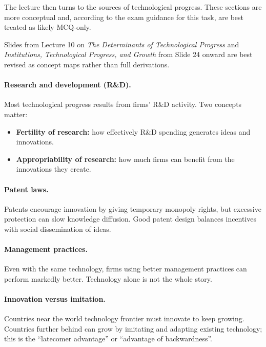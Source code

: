 \documentclass[12pt]{article}
\begin{document}
The lecture then turns to the sources of technological progress. These sections are more conceptual and, according to the exam guidance for this task, are best treated as likely MCQ-only.

\begin{examtip}[title={Exam Focus: Likely MCQ-only}]
Slides from Lecture 10 on \emph{The Determinants of Technological Progress} and \emph{Institutions, Technological Progress, and Growth} from Slide 24 onward are best revised as concept maps rather than full derivations.
\end{examtip}

\paragraph{Research and development (R\&D).}
Most technological progress results from firms' R\&D activity. Two concepts matter:
\begin{itemize}[leftmargin=1.5em]
\item \textbf{Fertility of research:} how effectively R\&D spending generates ideas and innovations.
\item \textbf{Appropriability of research:} how much firms can benefit from the innovations they create.
\end{itemize}

\paragraph{Patent laws.}
Patents encourage innovation by giving temporary monopoly rights, but excessive protection can slow knowledge diffusion. Good patent design balances incentives with social dissemination of ideas.

\paragraph{Management practices.}
Even with the same technology, firms using better management practices can perform markedly better. Technology alone is not the whole story.

\paragraph{Innovation versus imitation.}
Countries near the world technology frontier must innovate to keep growing. Countries further behind can grow by imitating and adapting existing technology; this is the ``latecomer advantage'' or ``advantage of backwardness''.
\end{document}
